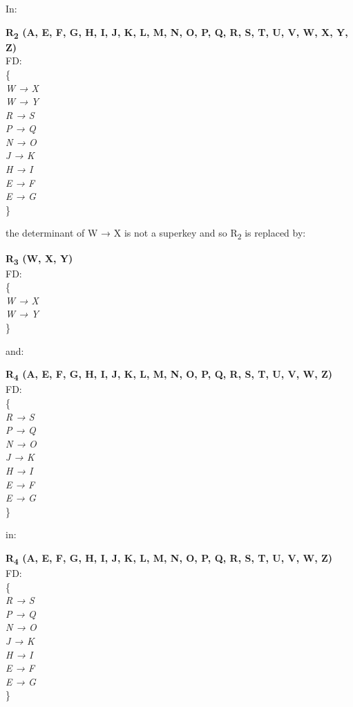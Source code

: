 In:\\

\begin{adjustwidth}{2cm}{}
\textbf{R\textsubscript{2} (A, E, F, G, H, I, J, K, L, M, N, O, P, Q, R, S, T, U, V, W, X, Y, Z)}\\
FD:\\
\{ \\
\textit{  
W → X\\
W → Y\\
R → S\\
P → Q\\
N → O\\
J → K\\
H → I\\
E → F\\
E → G\\
}
\}\\
\end{adjustwidth} 

the determinant of W → X is not a superkey and so R\textsubscript{2} is replaced by:

\begin{adjustwidth}{2cm}{}
\textbf{R\textsubscript{3} (W, X, Y)}\\
FD:\\
\{\\
\textit{ 
W → X\\
W → Y\\ 
}
\} \\
\end{adjustwidth} 

and:\\

\begin{adjustwidth}{2cm}{}
\textbf{R\textsubscript{4} (A, E, F, G, H, I, J, K, L, M, N, O, P, Q, R, S, T, U, V, W, Z)}\\
FD:\\ 
\{\\ 
\textit{ 
R → S\\
P → Q\\
N → O\\
J → K\\
H → I\\
E → F\\
E → G\\
} 
\}\\
\end{adjustwidth} 

in:\\

\begin{adjustwidth}{2cm}{}
\textbf{R\textsubscript{4} (A, E, F, G, H, I, J, K, L, M, N, O, P, Q, R, S, T, U, V, W, Z)}\\
FD:\\ \{\\ 
\textit{ 
R → S\\
P → Q\\
N → O\\
J → K\\
H → I\\
E → F\\
E → G\\
} 
\}\\
\end{adjustwidth} 

